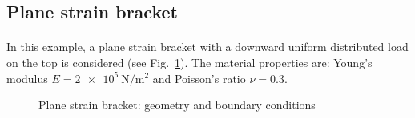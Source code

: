 \subsection{Plane strain bracket}
\paragraph{}
In this example, a plane strain bracket with a downward uniform distributed load on the top is considered (see Fig.~\ref{qdt_fig:ex_bracket_geo_bc}).
The material properties are: Young’s modulus $E = \SI{2e5}{\newton \per \square \meter}$ and Poisson’s ratio $\nu = 0.3$.
    \begin{figure}[H]
        \centering
        \begin{subfigure}[b]{1\linewidth}
            \centering
        \end{subfigure}
        \begin{subfigure}[b]{1\linewidth}
            \centering
        \end{subfigure}
        \caption{ Plane strain bracket: geometry and boundary conditions}
        \label{qdt_fig:ex_bracket_geo_bc}
    \end{figure}

